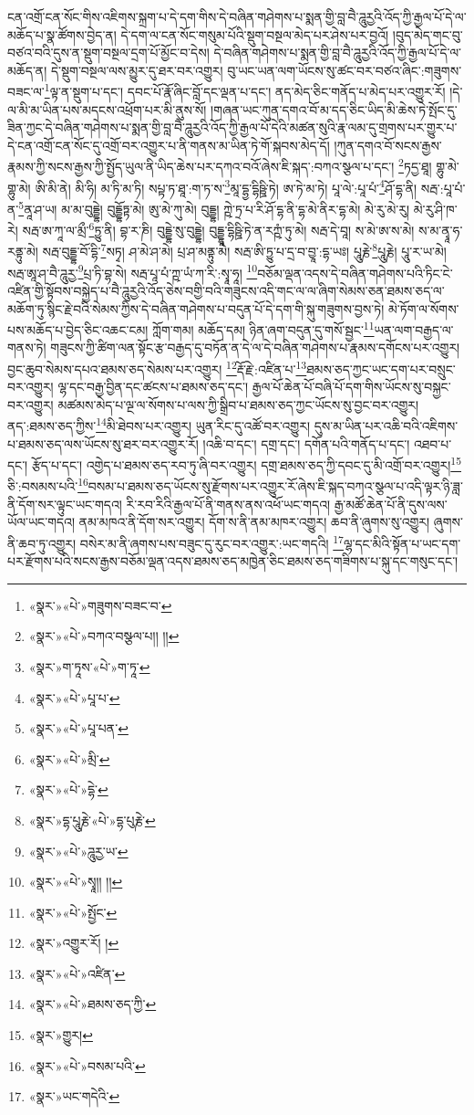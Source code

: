 ངན་འགྲོ་ངན་སོང་གིས་འཇིགས་སྐྲག་པ་དེ་དག་གིས་དེ་བཞིན་གཤེགས་པ་སྨན་གྱི་བླ་བཻ་ཌཱུརྱའི་འོད་ཀྱི་རྒྱལ་པོ་དེ་ལ་མཆོད་པ་སྣ་ཚོགས་བྱེད་ན། དེ་དག་ལ་ངན་སོང་གསུམ་པོའི་སྡུག་བསྔལ་མེད་པར་ཤེས་པར་བྱའོ། །བུད་མེད་གང་བུ་བཙའ་བའི་དུས་ན་སྡུག་བསྔལ་དྲག་པོ་མྱོང་བ་དེས། དེ་བཞིན་གཤེགས་པ་སྨན་གྱི་བླ་བཻ་ཌཱུརྱའི་འོད་ཀྱི་རྒྱལ་པོ་དེ་ལ་མཆོད་ན། དེ་སྡུག་བསྔལ་ལས་མྱུར་དུ་ཐར་བར་འགྱུར། བུ་ཡང་ཡན་ལག་ཡོངས་སུ་ཚང་བར་བཙའ་ཞིང་:གཟུགས་བཟང་ལ་\footnote{«སྣར་»«པེ་»གཟུགས་བཟང་བ་}ལྟ་ན་སྡུག་པ་དང་། དབང་པོ་རྣོ་ཞིང་བློ་དང་ལྡན་པ་དང་། ནད་མེད་ཅིང་གནོད་པ་མེད་པར་འགྱུར་རོ། །དེ་ལ་མི་མ་ཡིན་པས་མདངས་འཕྲོག་པར་མི་ནུས་སོ། །གཞན་ཡང་ཀུན་དགའ་བོ་མ་དད་ཅིང་ཡིད་མི་ཆེས་ཏེ་སྤོང་དུ་ཟིན་ཀྱང་དེ་བཞིན་གཤེགས་པ་སྨན་གྱི་བླ་བཻ་ཌཱུརྱའི་འོད་ཀྱི་རྒྱལ་པོ་དེའི་མཚན་སུའི་རྣ་ལམ་དུ་གྲགས་པར་གྱུར་པ་དེ་ངན་འགྲོ་ངན་སོང་དུ་འགྲོ་བར་འགྱུར་པ་ནི་གནས་མ་ཡིན་ཏེ་གོ་སྐབས་མེད་དོ། །ཀུན་དགའ་བོ་སངས་རྒྱས་རྣམས་ཀྱི་སངས་རྒྱས་ཀྱི་སྤྱོད་ཡུལ་ནི་ཡིད་ཆེས་པར་དཀའ་བའོ་ཞེས་ཇི་སྐད་:བཀའ་སྩལ་པ་དང་། \footnote{«སྣར་»«པེ་»བཀའ་བསྩལ་པ།། །། }ཏདྱ་ཐཱ། གྷུ་མེ་གྷུ་མེ། ཨི་མི་ནེ། མི་ཧི། མ་ཏི་མ་ཏི། སཔྟ་ཏ་ཐཱ་:ག་ཏ་ས་\footnote{«སྣར་»ག་ཏཱས་«པེ་»ག་ཏཱ་}མཱ་དྷྱ་དྷིཥྛི་ཏེ། ཨ་ཏེ་མ་ཏེ། པཱ་ལེ་:པཱ་པཾ་\footnote{«སྣར་»«པེ་»པཱ་པ་}ཤོ་དྷ་ནི། སརྦ་:པཱ་པཾ་ན་\footnote{«སྣར་»«པེ་»པཱ་པན་}ནཱ་ཤ་ཡ། མ་མ་བུདྡྷེ། བུདྡྷོཏྟ་མེ། ཨུ་མེ་ཀུ་མེ། བུདྡྷ། ཀྵེ་ཏྲ་པ་རི་ཤོ་དྷ་ནི་དྷ་མེ་ནིར་དྷ་མེ། མེ་རུ་མེ་རུ། མེ་རུ་ཤི་ཁ་རེ། སརྦ་ཨ་ཀཱ་ལ་མྲྀ་\footnote{«སྣར་»«པེ་»མྲི་}ཏྱུ་ནི། བྷ་ར་ཎི། བུདྡྷེ་སུ་བུདྡྷེ། བུདྡྷཱ་དྷིཥྛི་ཏེ་ན་རཀྵཾ་ཏུ་མེ། སརྦ་དེ་བཱ། ས་མེ་ཨ་ས་མེ། ས་མ་ནྭཱ་ཧ་རནྟུ་མེ། སརྦ་བུདྡྷ་བོ་དྷི་\footnote{«སྣར་»«པེ་»དྷེ་}སཏྭ། ཤ་མེ་ཤ་མེ། པྲ་ཤ་མནྟུ་མེ། སརྦ་ཨི་ཏྱུ་པ་དྲ་བ་བྱཱ་:དྷ་ཡཿ། པཱུརྞེ་\footnote{«སྣར་»དྷ་པཱུརྞེ་«པེ་»དྷ་པུརྞེ་}པཱུརྞེ། པཱུ་ར་ཡ་མེ། སརྦ་ཨཱ་ཤ་བཻ་ཌཱུརྱ་\footnote{«སྣར་»«པེ་»ཌཱུརྱ་ཡ་}པྲ་ཏི་བྷ་སེ། སརྦ་པཱ་པཾ་ཀྵ་ཡཾ་ཀ་རི་:སྭཱ་ཧཱ། \footnote{«སྣར་»«པེ་»སྭཱ།། །། }བཅོམ་ལྡན་འདས་དེ་བཞིན་གཤེགས་པའི་ཏིང་ངེ་འཛིན་གྱི་སྟོབས་བསྐྱེད་པ་བཻ་ཌཱུརྱའི་འོད་ཅེས་བགྱི་བའི་གཟུངས་འདི་གང་ལ་ལ་ཞིག་སེམས་ཅན་ཐམས་ཅད་ལ་མཆོག་ཏུ་སྙིང་རྗེ་བའི་སེམས་ཀྱིས་དེ་བཞིན་གཤེགས་པ་བདུན་པོ་དེ་དག་གི་སྐུ་གཟུགས་བྱས་ཏེ། མེ་ཏོག་ལ་སོགས་པས་མཆོད་པ་བྱེད་ཅིང་འཆང་ངམ། ཀློག་གམ། མཆོད་དམ། ཉིན་ཞག་བདུན་དུ་གསོ་སྦྱང་\footnote{«སྣར་»«པེ་»སྤྱོང་}ཡན་ལག་བརྒྱད་ལ་གནས་ཏེ། གཟུངས་ཀྱི་ཚིག་ལན་སྟོང་རྩ་བརྒྱད་དུ་བཏོན་ན་དེ་ལ་དེ་བཞིན་གཤེགས་པ་རྣམས་དགོངས་པར་འགྱུར། བྱང་ཆུབ་སེམས་དཔའ་ཐམས་ཅད་སེམས་པར་འགྱུར། \footnote{«སྣར་»འགྱུར་རོ། ། }རྡོ་རྗེ་:འཛིན་པ་\footnote{«སྣར་»«པེ་»འཛིན་}ཐམས་ཅད་ཀྱང་ཡང་དག་པར་བསྲུང་བར་འགྱུར། ལྷ་དང་བརྒྱ་བྱིན་དང་ཚངས་པ་ཐམས་ཅད་དང་། རྒྱལ་པོ་ཆེན་པོ་བཞི་པོ་དག་གིས་ཡོངས་སུ་བསྐྱང་བར་འགྱུར། མཚམས་མེད་པ་ལྔ་ལ་སོགས་པ་ལས་ཀྱི་སྒྲིབ་པ་ཐམས་ཅད་ཀྱང་ཡོངས་སུ་བྱང་བར་འགྱུར། ནད་:ཐམས་ཅད་ཀྱིས་\footnote{«སྣར་»«པེ་»ཐམས་ཅད་ཀྱི་}མི་ཐེབས་པར་འགྱུར། ཡུན་རིང་དུ་འཚོ་བར་འགྱུར། དུས་མ་ཡིན་པར་འཆི་བའི་འཇིགས་པ་ཐམས་ཅད་ལས་ཡོངས་སུ་ཐར་བར་འགྱུར་རོ། །འཆི་བ་དང་། དགྲ་དང་། དགོན་པའི་གནོད་པ་དང་། འཐབ་པ་དང་། རྩོད་པ་དང་། འགྱེད་པ་ཐམས་ཅད་རབ་ཏུ་ཞི་བར་འགྱུར། དགྲ་ཐམས་ཅད་ཀྱི་དབང་དུ་མི་འགྲོ་བར་འགྱུར།\footnote{«སྣར་»གྱུར།} ཅི་:བསམས་པའི་\footnote{«སྣར་»«པེ་»བསམ་པའི་}བསམ་པ་ཐམས་ཅད་ཡོངས་སུ་རྫོགས་པར་འགྱུར་རོ་ཞེས་ཇི་སྐད་བཀའ་སྩལ་པ་འདི་ལྟར་ཉི་ཟླ་ནི་དོག་སར་ལྟུང་ཡང་གདའ། རི་རབ་རིའི་རྒྱལ་པོ་ནི་གནས་ནས་འཕོ་ཡང་གདའ། རྒྱ་མཚོ་ཆེན་པོ་ནི་དུས་ལས་ཡོལ་ཡང་གདའ། ནམ་མཁའ་ནི་དོག་སར་འགྱུར། དོག་ས་ནི་ནམ་མཁར་འགྱུར། ཆབ་ནི་ཞུགས་སུ་འགྱུར། ཞུགས་ནི་ཆབ་ཏུ་འགྱུར། བསེར་མ་ནི་ཞགས་པས་བཟུང་དུ་རུང་བར་འགྱུར་:ཡང་གདའི། \footnote{«སྣར་»ཡང་གདེའི་}ལྷ་དང་མིའི་སྟོན་པ་ཡང་དག་པར་རྫོགས་པའི་སངས་རྒྱས་བཅོམ་ལྡན་འདས་ཐམས་ཅད་མཁྱེན་ཅིང་ཐམས་ཅད་གཟིགས་པ་སྐུ་དང་གསུང་དང་། 